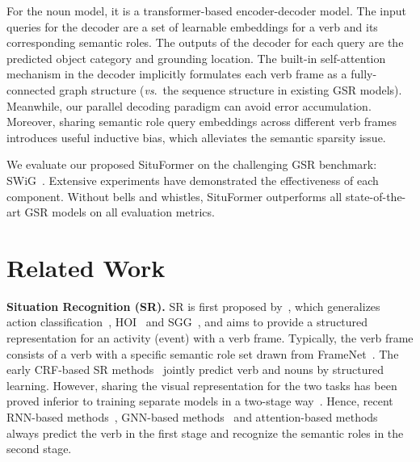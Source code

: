 \documentclass[letterpaper]{article} \usepackage{aaai22}  \usepackage{times}  \usepackage{helvet}  \usepackage{courier}  \usepackage[hyphens]{url}  \usepackage{graphicx} \urlstyle{rm} \def\UrlFont{\rm}  \usepackage{natbib}  \usepackage{caption} \DeclareCaptionStyle{ruled}{labelfont=normalfont,labelsep=colon,strut=off} \frenchspacing  \setlength{\pdfpagewidth}{8.5in}  \setlength{\pdfpageheight}{11in}
\newcommand{\vs}{\textit{vs}.}
\begin{document}
For the noun model, it is a transformer-based encoder-decoder model. The input queries for the decoder are a set of learnable embeddings for a verb and its corresponding semantic roles. The outputs of the decoder for each query are the predicted object category and grounding location. The built-in self-attention mechanism in the decoder implicitly formulates each verb frame as a fully-connected graph structure (\vs~the sequence structure in existing GSR models). Meanwhile, our parallel decoding paradigm can avoid error accumulation. Moreover, sharing semantic role query embeddings across different verb frames introduces useful inductive bias, which alleviates the semantic sparsity issue.


We evaluate our proposed SituFormer on the challenging GSR benchmark: SWiG~\cite{pratt2020grounded}. Extensive experiments have demonstrated the effectiveness of each component. Without bells and whistles, SituFormer outperforms all state-of-the-art GSR models on all evaluation metrics.




























\section{Related Work}
\noindent\textbf{Situation Recognition (SR).}
SR is first proposed by~\cite{gupta2015visual,yatskar2016situation}, which generalizes action classification~\cite{carreira2017quo,9151084}, HOI~\cite{liao2020ppdm,zou2021end,wei2020hose} and SGG~\cite{chen2019counterfactual,cong2021spatial}, and aims to provide a structured representation for an activity (event) with a verb frame. Typically, the verb frame consists of a verb with a specific semantic role set drawn from FrameNet~\cite{10.3115/980845.980860}. The early CRF-based SR methods~\cite{yatskar2016situation, yatskar2017commonly} jointly predict verb and nouns by structured learning. 
However, sharing the visual representation for the two tasks has been proved inferior to training separate models in a two-stage way~\cite{mallya2017recurrent}.
Hence, recent RNN-based methods~\cite{mallya2017recurrent}, GNN-based methods~\cite{li2017situation,suhail2019mixture} and attention-based methods~\cite{9156513} always predict the verb in the first stage and recognize the semantic roles in the second stage.
\end{document}
